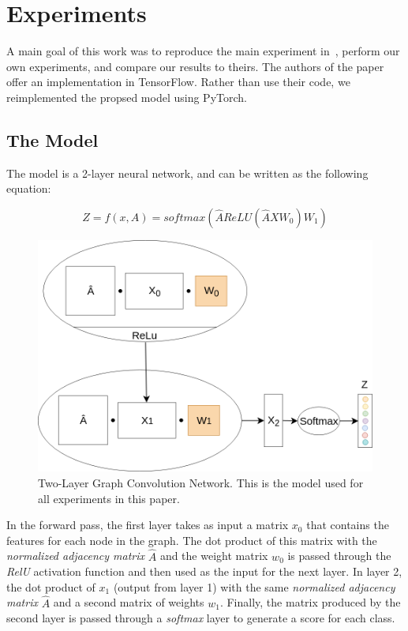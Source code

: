 \section{Experiments}

A main goal of this work was to reproduce the main experiment in~\cite{Kipf2016}, perform our own experiments, and compare our results to theirs. The authors of the paper offer an implementation in TensorFlow. Rather than use their code, we reimplemented the propsed model using PyTorch. 

\subsection{The Model}
The model is a 2-layer neural network, and can be written as the following equation:

\begin{equation}
    \label{eq:model}
    Z = f(x,A) = softmax(\hat{A}ReLU(\hat{A}XW_{0})W_{1}) 
\end{equation}

\begin{figure}[h!]
  \centering
  \includegraphics[width=0.75\linewidth]{media/model_right.png}
  
  \caption{Two-Layer Graph Convolution Network. This is the model used for all experiments in this paper.}
  \label{fig:model}
\end{figure}

In the forward pass, the first layer takes as input a matrix $x_{0}$ that contains the features for each node in the graph. The dot product of this matrix with the \textit{normalized adjacency matrix} $\hat{A}$ and the weight matrix $w_{0}$ is passed through the \textit{RelU} activation function and then used as the input for the next layer. In layer 2, the dot product of $x_{1}$ (output from layer 1) with the same \textit{normalized adjacency matrix} $\hat{A}$ and a second matrix of weights $w_{1}$. Finally, the matrix produced by the second layer is passed through a \textit{softmax} layer to generate a score for each class.

